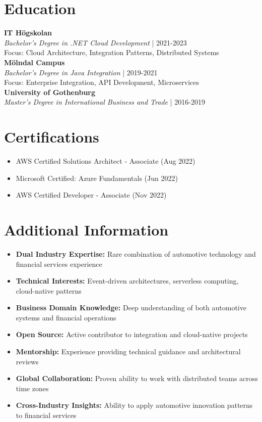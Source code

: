 \documentclass[11pt,a4paper]{article}
\begin{document}
\vspace{6pt}
\section*{Education}
\textbf{IT Högskolan}\\
\textit{Bachelor's Degree in .NET Cloud Development} | 2021-2023\\
Focus: Cloud Architecture, Integration Patterns, Distributed Systems\\
\textbf{Mölndal Campus}\\
\textit{Bachelor's Degree in Java Integration} | 2019-2021\\
Focus: Enterprise Integration, API Development, Microservices\\
\textbf{University of Gothenburg}\\
\textit{Master's Degree in International Business and Trade} | 2016-2019\\

\vspace{6pt}
\section*{Certifications}
\begin{itemize}[noitemsep]
\item AWS Certified Solutions Architect - Associate (Aug 2022)
\item Microsoft Certified: Azure Fundamentals (Jun 2022)
\item AWS Certified Developer - Associate (Nov 2022)
\end{itemize}

\vspace{6pt}
\section*{Additional Information}
\begin{itemize}[noitemsep]
\item \textbf{Dual Industry Expertise:} Rare combination of automotive technology and financial services experience
\item \textbf{Technical Interests:} Event-driven architectures, serverless computing, cloud-native patterns
\item \textbf{Business Domain Knowledge:} Deep understanding of both automotive systems and financial operations
\item \textbf{Open Source:} Active contributor to integration and cloud-native projects
\item \textbf{Mentorship:} Experience providing technical guidance and architectural reviews
\item \textbf{Global Collaboration:} Proven ability to work with distributed teams across time zones
\item \textbf{Cross-Industry Insights:} Ability to apply automotive innovation patterns to financial services
\end{itemize}
\end{document}
